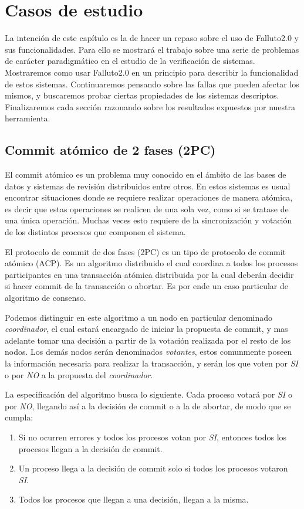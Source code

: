 \documentclass[titlepage, 12pt]{book}
\begin{document}
\chapter{Casos de estudio}
\label{CapCasosDeEstudio}

La intenci\'on de este cap\'itulo es la de hacer un repaso sobre el uso de Falluto2.0 y sus funcionalidades. Para ello se mostrar\'a el trabajo sobre una serie de problemas de car\'acter paradigm\'atico en el estudio de la verificaci\'on de sistemas. Mostraremos como usar Falluto2.0 en un principio para describir la funcionalidad de estos sistemas. Continuaremos pensando sobre las fallas que pueden afectar los mismos, y buscaremos probar ciertas propiedades de los sistemas descriptos. Finalizaremos cada secci\'on razonando sobre los resultados expuestos por nuestra herramienta.

\section{Commit at\'omico de 2 fases (2PC)}

El commit at\'omico es un problema muy conocido en el \'ambito de las bases de datos y sistemas de revisi\'on distribuidos entre otros. En estos sistemas es usual encontrar situaciones donde se requiere realizar operaciones de manera at\'omica, es decir que estas operaciones se realicen de una sola vez, como si se tratase de una \'unica operaci\'on. Muchas veces esto requiere de la sincronizaci\'on y votaci\'on de los distintos procesos que componen el sistema.

El protocolo de commit de dos fases (2PC) es un tipo de protocolo de commit at\'omico (ACP). Es un algoritmo distribuido el cual coordina a todos los procesos participantes en una transacci\'on at\'omica distribuida por la cual deber\'an decidir si hacer commit de la transacci\'on o abortar. Es por ende un caso particular de algoritmo de consenso.

Podemos distinguir en este algoritmo a un nodo en particular denominado \textit{coordinador}, el cual estar\'a encargado de iniciar la propuesta de commit, y mas adelante tomar una decisi\'on a partir de la votaci\'on realizada por el resto de los nodos. Los dem\'as nodos ser\'an denominados \textit{votantes}, estos comunmente poseen la informaci\'on necesaria para realizar la transacci\'on, y ser\'an los que voten por \textit{SI} o por \textit{NO} a la propuesta del \textit{coordinador}.

La especificaci\'on del algoritmo busca lo siguiente. Cada proceso votar\'a por \textit{SI} o por \textit{NO}, llegando as\'i a la decisi\'on de commit o a la de abortar, de modo que se cumpla:
\begin{enumerate}
\item Si no ocurren errores y todos los procesos votan por \textit{SI}, entonces todos los procesos llegan a la decisi\'on de commit.
\item Un proceso llega a la decisi\'on de commit solo si todos los procesos votaron \textit{SI}.
\item Todos los procesos que llegan a una decisi\'on, llegan a la misma.
\end{enumerate}
\end{document}
